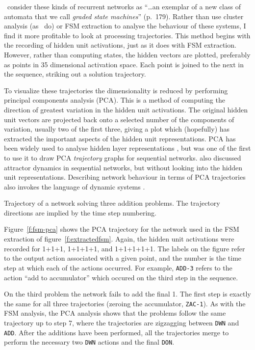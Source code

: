 \citeauthor{servgrad}\ consider these kinds of recurrent networks as
``\ldots an exemplar of a new class of automata that we call {\em graded
state machines}'' (p.~179).  Rather than use cluster analysis
(as \citeauthor{servgrad}\ do)
or FSM extraction to analyse the behaviour
of these systems, I find it more profitable to look at processing
trajectories.  This method begins with the recording of hidden unit
activations, just as it does with FSM extraction.  However, rather than
computing states, the hidden vectors are plotted, preferably as
points in 35 dimensional activation space.  Each point is joined to the
next in the sequence, striking out a solution trajectory.

To visualize these trajectories the dimensionality is reduced by performing
principal components analysis (PCA).  This is a method of computing the
direction of greatest variation in the hidden unit activations.  The
original hidden unit vectors are projected back onto a selected number of
the components of variation, usually two of the first three, giving a plot
which (hopefully) has extracted the important aspects of the hidden unit
representations.  PCA has been widely used to analyse hidden layer
representations \cite{dennanal}, but  was one of
the first to use it to draw PCA {\em trajectory} graphs for sequential
networks.  also discussed attractor dynamics in sequential
networks, but without looking into the hidden unit representations.
Describing network behaviour in terms of PCA trajectories also invokes the
language of dynamic systems \cite{cummrepr}.

\begin{fancyfigure}
\centerline{}
\caption{Trajectory of a network solving three addition problems.
The
trajectory directions
are implied by the time step numbering.}
\label{f:fsm-pca}
\end{fancyfigure}

Figure~\ref{f:fsm-pca} shows the PCA trajectory for the network used in the
FSM extraction of figure~\ref{f:extractedfsm}.  Again, the hidden unit
activations were recorded for 1+1+1, 1+1+1+1, and 1+1+1+1+1. The labels
on the figure
refer to the output action associated with a given point, and the number is
the time step at which each of the actions occurred.  For example,
\protect\verb|ADD-3| refers to the action ``add to accumulator'' which
occured on the third step in the sequence.

On the third
problem the
network fails to add the final 1.  The first step is exactly the same for
all three trajectories (zeroing the accumulator, \verb|ZAC-1|). As with the
FSM analysis, the PCA analysis shows that the problems follow the same
trajectory up to step 7, where the trajectories are zigzagging between
\verb|DWN| and \verb|ADD|.  After the additions have been performed, all
the trajectories merge to perform the necessary two \verb|DWN| actions and
the final \verb|DON|.

